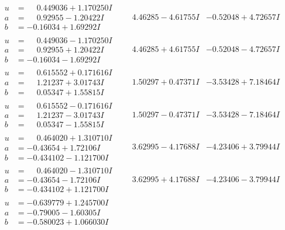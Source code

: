 \documentclass[1p]{elsarticle_modified}
\theoremstyle{definition}
\begin{document}
$$\begin{array}{c|c|c}
\begin{aligned}
u &= \phantom{-}0.449036 + 1.170250 I \\
a &= \phantom{-}0.92955 - 1.20422 I \\
b &= -0.16034 + 1.69292 I\end{aligned}
 & \phantom{-}4.46285 - 4.61755 I & -0.52048 + 4.72657 I \\ \hline\begin{aligned}
u &= \phantom{-}0.449036 - 1.170250 I \\
a &= \phantom{-}0.92955 + 1.20422 I \\
b &= -0.16034 - 1.69292 I\end{aligned}
 & \phantom{-}4.46285 + 4.61755 I & -0.52048 - 4.72657 I \\ \hline\begin{aligned}
u &= \phantom{-}0.615552 + 0.171616 I \\
a &= \phantom{-}1.21237 + 3.01743 I \\
b &= \phantom{-}0.05347 + 1.55815 I\end{aligned}
 & \phantom{-}1.50297 + 0.47371 I & -3.53428 + 7.18464 I \\ \hline\begin{aligned}
u &= \phantom{-}0.615552 - 0.171616 I \\
a &= \phantom{-}1.21237 - 3.01743 I \\
b &= \phantom{-}0.05347 - 1.55815 I\end{aligned}
 & \phantom{-}1.50297 - 0.47371 I & -3.53428 - 7.18464 I \\ \hline\begin{aligned}
u &= \phantom{-}0.464020 + 1.310710 I \\
a &= -0.43654 + 1.72106 I \\
b &= -0.434102 - 1.121700 I\end{aligned}
 & \phantom{-}3.62995 - 4.17688 I & -4.23406 + 3.79944 I \\ \hline\begin{aligned}
u &= \phantom{-}0.464020 - 1.310710 I \\
a &= -0.43654 - 1.72106 I \\
b &= -0.434102 + 1.121700 I\end{aligned}
 & \phantom{-}3.62995 + 4.17688 I & -4.23406 - 3.79944 I \\ \hline\begin{aligned}
u &= -0.639779 + 1.245700 I \\
a &= -0.79005 - 1.60305 I \\
b &= -0.580023 + 1.066030 I\end{aligned}

\end{array}$$
\end{document}
